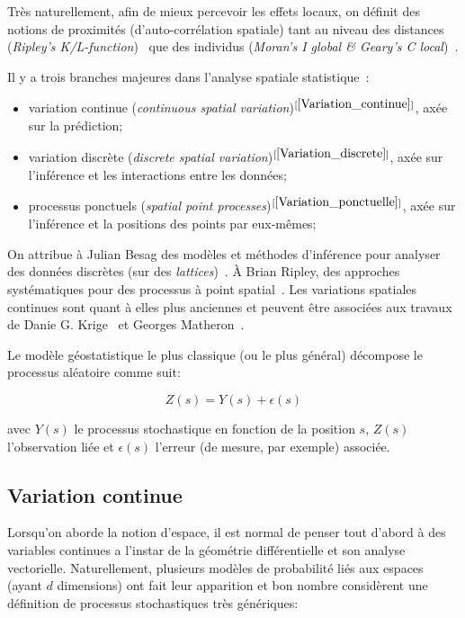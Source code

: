 Très naturellement, afin de mieux percevoir les effets locaux, on définit des notions de proximités (d'auto-corrélation spatiale) tant au niveau des distances (\textit{Ripley's K/L-function})~\cite{dixon2002ripley} que des individus (\textit{Moran's I global \& Geary's C local})~\cite{f2007methods}.

Il y a trois branches majeures dans l'analyse spatiale statistique~\cite{gelfand2010handbook}:
\begin{itemize}
    \item variation continue (\textit{continuous spatial variation})$^{[\ref{Variation_continue}]}$, axée sur la prédiction;
    \item variation discrète (\textit{discrete spatial variation})$^{[\ref{Variation_discrete}]}$, axée sur l'inférence et les interactions entre les données;
    \item processus ponctuels (\textit{spatial point processes})$^{[\ref{Variation_ponctuelle}]}$, axée sur l'inférence et la positions des points par eux-mêmes;
\end{itemize}

On attribue à Julian Besag des modèles et méthodes d'inférence pour analyser des données discrètes (sur des \textit{lattices})~\cite{besag1974spatial}. À Brian Ripley, des approches systématiques pour des processus à point spatial~\cite{ripley1977modelling}. Les variations spatiales continues sont quant à elles plus anciennes et peuvent être associées aux travaux de Danie G. Krige~\cite{cressie1990origins} et Georges Matheron~\cite{matheron1973intrinsic}.

Le modèle géostatistique le plus classique (ou le plus général) décompose le processus aléatoire comme suit:

\begin{equation}
    Z(s) = Y(s) + \epsilon(s)
\end{equation}

avec $Y(s)$ le processus stochastique en fonction de la position $s$, $Z(s)$ l'observation liée et $\epsilon(s)$ l'erreur (de mesure, par exemple) associée.

\subsection{Variation continue}\label{Variation_continue}

Lorsqu'on aborde la notion d'espace, il est normal de penser tout d'abord à des variables continues a l'instar de la géométrie différentielle et son analyse vectorielle. Naturellement, plusieurs modèles de probabilité liés aux espaces (ayant $d$ dimensions) ont fait leur apparition et bon nombre considèrent une définition de processus stochastiques très génériques:

